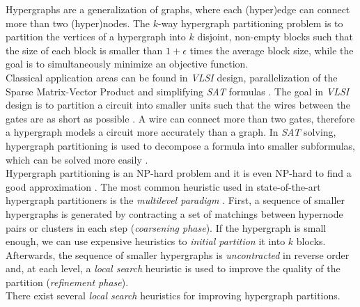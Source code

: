 Hypergraphs are a generalization of graphs, where each (hyper)edge can connect 
more than two (hyper)nodes. The $k$-way hypergraph partitioning problem is to 
partition the vertices of a hypergraph into $k$ disjoint, non-empty blocks such
that the size of each block is smaller than $1+\epsilon$ times the
average block size, while the goal is to simultaneously minimize an objective function. \\
Classical application areas can be found in \emph{VLSI} design, parallelization of
the Sparse Matrix-Vector Product and simplifying \emph{SAT} formulas 
\cite{karypis1999multilevel, mann2014formula, papa2007hypergraph}. The goal 
in \emph{VLSI} design is to partition a circuit into smaller units such that
the wires between the gates are as short as possible \cite{bulucc2016recent}.
A wire can connect more than two gates, therefore a hypergraph models a circuit more
accurately than a graph. In \emph{SAT} solving, hypergraph partitioning is used to
decompose a formula into smaller subformulas, which can be solved more easily \cite{mann2014formula}.\\
Hypergraph partitioning is an NP-hard problem \cite{lengauer2012combinatorial} and
it is even NP-hard to find a good approximation \cite{bui1992finding}.
The most common heuristic used in state-of-the-art hypergraph partitioners is the
\emph{multilevel paradigm} \cite{catalyurek1999hypergraph, heuer2017improving, karypis1999multilevel}.
First, a sequence of smaller hypergraphs is generated by contracting a set of matchings between hypernode pairs
or clusters in each step (\emph{coarsening phase}). If the hypergraph is small enough, we can use expensive
heuristics to \emph{initial partition} it into $k$ blocks. Afterwards, the sequence
of smaller hypergraphs is \emph{uncontracted} in reverse order and, at each level, a 
\emph{local search} heuristic is used to improve the quality of the partition 
(\emph{refinement phase}). \\
There exist several \emph{local search} heuristics for improving hypergraph partitions.
